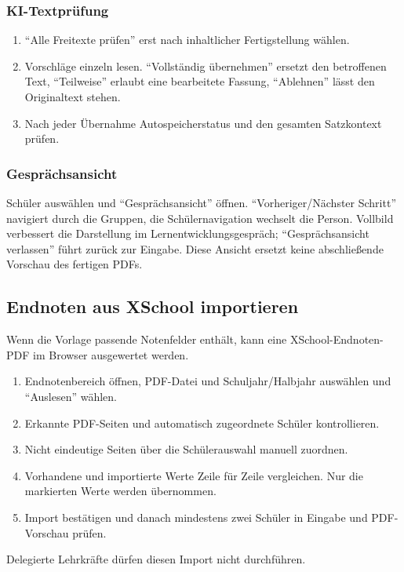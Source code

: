 \documentclass[12pt,a4paper]{article}
\begin{document}
\subsubsection{KI-Textprüfung}
\begin{enumerate}
  \item \enquote{Alle Freitexte prüfen} erst nach inhaltlicher Fertigstellung wählen.
  \item Vorschläge einzeln lesen. \enquote{Vollständig übernehmen} ersetzt den betroffenen Text, \enquote{Teilweise} erlaubt eine bearbeitete Fassung, \enquote{Ablehnen} lässt den Originaltext stehen.
  \item Nach jeder Übernahme Autospeicherstatus und den gesamten Satzkontext prüfen.
\end{enumerate}

\subsubsection{Gesprächsansicht}
Schüler auswählen und \enquote{Gesprächsansicht} öffnen. \enquote{Vorheriger/Nächster Schritt} navigiert durch die Gruppen, die Schülernavigation wechselt die Person. Vollbild verbessert die Darstellung im Lernentwicklungsgespräch; \enquote{Gesprächsansicht verlassen} führt zurück zur Eingabe. Diese Ansicht ersetzt keine abschließende Vorschau des fertigen PDFs.

\subsection*{Endnoten aus XSchool importieren}
Wenn die Vorlage passende Notenfelder enthält, kann eine XSchool-Endnoten-PDF im Browser ausgewertet werden.
\begin{enumerate}
  \item Endnotenbereich öffnen, PDF-Datei und Schuljahr/Halbjahr auswählen und \enquote{Auslesen} wählen.
  \item Erkannte PDF-Seiten und automatisch zugeordnete Schüler kontrollieren.
  \item Nicht eindeutige Seiten über die Schülerauswahl manuell zuordnen.
  \item Vorhandene und importierte Werte Zeile für Zeile vergleichen. Nur die markierten Werte werden übernommen.
  \item Import bestätigen und danach mindestens zwei Schüler in Eingabe und PDF-Vorschau prüfen.
\end{enumerate}
Delegierte Lehrkräfte dürfen diesen Import nicht durchführen.
\end{document}

